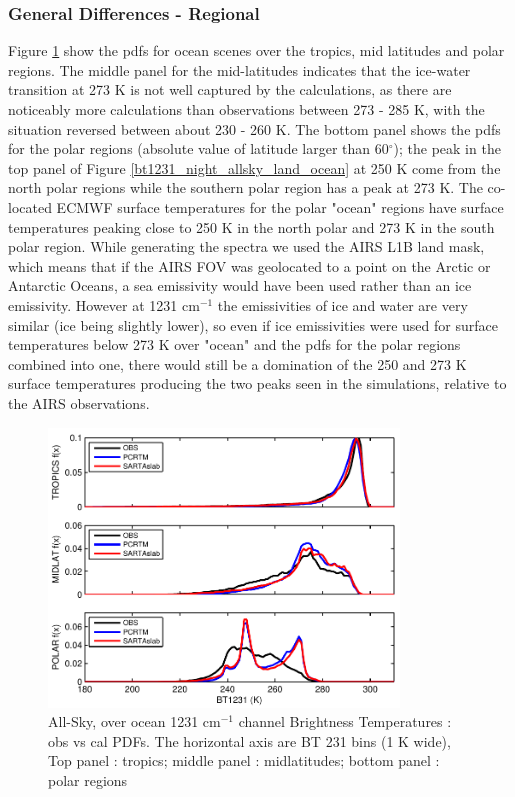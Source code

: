 \documentclass[agupp]{aguplus}              %
\newcommand{\wn}{cm$^{-1}$\xspace}
\newcommand{\mydeg}{\mbox{$^\circ$}}
\begin{document}
\begin{article}
\subsubsection{General Differences - Regional} Figure
\ref{bt1231_night_allsky_ocean_trop_midlat_poles} show the pdfs for
ocean scenes over the tropics, mid latitudes and polar regions. The
middle panel for the mid-latitudes indicates that the ice-water
transition at 273 K is not well captured by the calculations, as there
are noticeably more calculations than observations between 273 - 285
K, with the situation reversed between about 230 - 260 K. The bottom
panel shows the pdfs for the polar regions (absolute value of latitude
larger than 60\mydeg); the peak in the top panel of Figure
\ref{bt1231_night_allsky_land_ocean} at 250 K come from the north
polar regions while the southern polar region has a peak at 273 K.
The co-located ECMWF surface temperatures for the polar "ocean"
regions have surface temperatures peaking close to 250 K in the north
polar and 273 K in the south polar region. While generating the
spectra we used the AIRS L1B land mask, which means that if the AIRS
FOV was geolocated to a point on the Arctic or Antarctic Oceans, a sea
emissivity would have been used rather than an ice emissivity. However
at 1231 \wn the emissivities of ice and water are very similar (ice
being slightly lower), so even if ice emissivities were used for
surface temperatures below 273 K over "ocean" and the pdfs for the
polar regions combined into one, there would still be a domination of
the 250 and 273 K surface temperatures producing the two peaks seen in
the simulations, relative to the AIRS observations. 

\begin{figure}[h]
\noindent\includegraphics[width=22pc]{FIGS/ecm_cloudBT1231_gev_trop_midlat_poles}
\caption{All-Sky, over ocean 1231 \wn channel Brightness Temperatures : obs vs cal PDFs. 
The horizontal axis are BT 231 bins (1 K wide), Top panel : tropics; 
middle panel : midlatitudes; bottom panel : polar regions}
\label{bt1231_night_allsky_ocean_trop_midlat_poles}
\end{figure}


\end{article}
\end{document}
